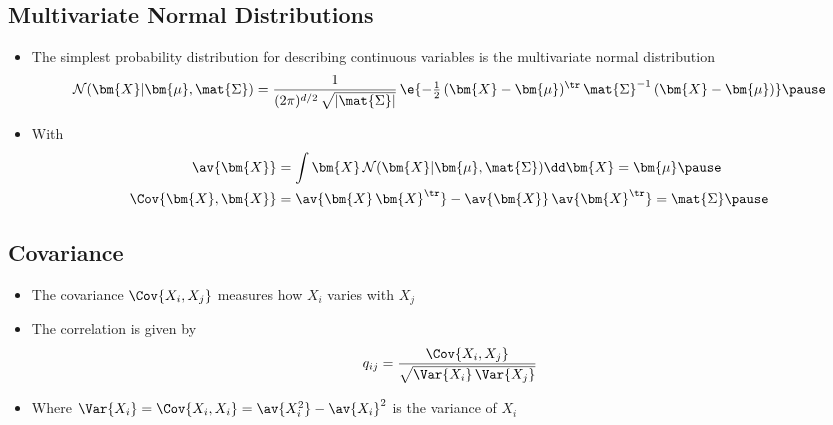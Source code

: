 
\begin{slide}
\section{Multivariate Normal Distributions}

\begin{PauseHighLight}
  \begin{itemize}
  \item The simplest probability distribution for describing continuous
    variables is the multivariate normal distribution
    \begin{align*}
      \mathcal{N}(\bm{X}|\bm{\mu}, \mat{\Sigma}) = 
      \frac{1}{(2\pi)^{d/2}\,\sqrt{|\mat{\Sigma}|}} \, \e{-\tfrac{1}{2}\,(\bm{X}-\bm{\mu})^\tr
      \,\mat{\Sigma}^{-1} \,(\bm{X}-\bm{\mu})}\pause
    \end{align*}
  \item With
    \begin{align*}
      \av{\bm{X}} &= \int \bm{X} \, \mathcal{N}(\bm{X}|\bm{\mu},
      \mat{\Sigma}) \dd \bm{X} = \bm{\mu} \pause \\
      \Cov{\bm{X}, \bm{X}} &= \av{\bm{X}\,\bm{X}^\tr} - \av{\bm{X}}
                             \,\av{\bm{X}^\tr} = \mat{\Sigma}\pause
    \end{align*}
  \end{itemize}
\end{PauseHighLight}

\end{slide}


\begin{slide}
\section{Covariance}

\begin{PauseHighLight}
  \begin{itemize}
  \item The covariance $\Cov{X_i, X_j}$ measures how $X_i$ varies with
    $X_j$\pause
  \item The correlation is given by
    \begin{align*}
      q_{ij} = \frac{\Cov{X_i, X_j}}{\sqrt{\Var{X_i}\,\Var{X_j}}}
    \end{align*}
  \item Where $\Var{X_i} = \Cov{X_i,X_i} = \av{X_i^2}-\av{X_i}^2$ is the
    variance of $X_i$\pause
  \end{itemize}
\end{PauseHighLight}

\end{slide}

